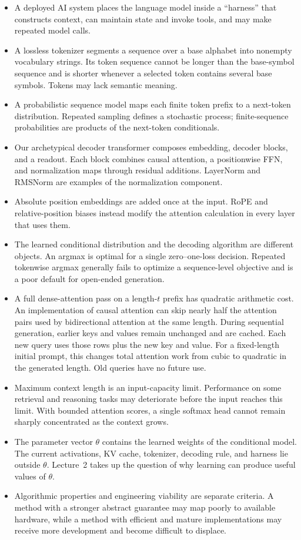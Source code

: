 \documentclass[11pt,twoside]{article}
\theoremstyle{plain}
\theoremstyle{definition}
\theoremstyle{remark}
\begin{document}
\begin{itemize}[leftmargin=*]
\item A deployed AI system places the language model inside a
``harness'' that constructs context, can maintain state and invoke tools, and
may make repeated model calls.
\item A lossless tokenizer segments a sequence over a base alphabet into
nonempty vocabulary strings. Its token sequence cannot be longer than the
base-symbol sequence and is shorter whenever a selected token contains several
base symbols. Tokens may lack semantic meaning.
\item A probabilistic sequence model maps each finite token prefix to a
next-token distribution. Repeated sampling defines a stochastic process;
finite-sequence probabilities are products of the next-token conditionals.
\item Our archetypical decoder transformer composes embedding, decoder
blocks, and a readout. Each block combines causal attention, a positionwise
FFN, and normalization maps through residual additions.
LayerNorm and RMSNorm are examples of the normalization component.
\item Absolute position embeddings are added once at the input. RoPE and
relative-position biases instead modify the attention calculation in every
layer that uses them.
\item The learned conditional distribution and the decoding algorithm are
different objects. An argmax is optimal for a single zero--one-loss decision.
Repeated tokenwise argmax generally fails to optimize a sequence-level
objective and is a poor default for open-ended generation.
\item A full dense-attention pass on a length-$t$ prefix has quadratic
arithmetic cost. An implementation of causal attention can skip nearly half
the attention pairs used by bidirectional attention at the same length. During
sequential generation, earlier keys and values remain unchanged and are
cached. Each new query uses those rows plus the new key and value. For a
fixed-length initial prompt, this changes total attention work from cubic
to quadratic in the generated length. Old queries have no future use.
\item Maximum context length is an input-capacity limit. Performance on some
retrieval and reasoning tasks may deteriorate before the input reaches this
limit. With bounded attention scores, a single softmax head cannot remain
sharply concentrated as the context grows.
\item The parameter vector $\theta$ contains the learned weights of the
conditional model. The current activations, KV cache, tokenizer, decoding rule,
and harness lie outside $\theta$. Lecture~2 takes up the question of why
learning can produce useful values of $\theta$.
\item Algorithmic properties and engineering viability are separate criteria.
A method with a stronger abstract guarantee may map poorly to available
hardware, while a method with efficient and mature implementations may receive
more development and become difficult to displace.
\end{itemize}
\end{document}
